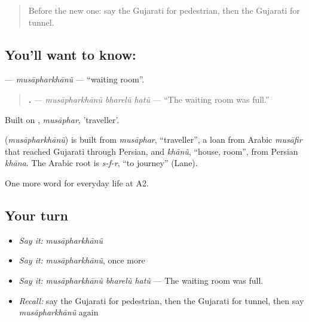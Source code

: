 \label{lesson:GU-C212-musapharkhanu}



\begin{quote}
Before the new one: say the Gujarati for pedestrian, then the Gujarati for tunnel.
\end{quote}

\subsection*{You'll want to know: }
\textbf{} — \emph{musāpharkhānũ} — \textquotedblleft{}waiting room\textquotedblright{}.

\begin{quote}
\textbf{  .} — \emph{musāpharkhānũ bharelũ hatũ} — \textquotedblleft{}The waiting room was full.\textquotedblright{}
\end{quote}

Built on \textbf{}, \emph{musāphar}, 'traveller'.

\begin{cousinweb}
\textbf{} (\emph{musāpharkhānũ}) is built from \emph{musāphar}, \textquotedblleft{}traveller\textquotedblright{}, a loan from Arabic \emph{musāfir} that reached Gujarati through Persian, and \emph{khānũ}, \textquotedblleft{}house, room\textquotedblright{}, from Persian \emph{khāna}. The Arabic root is \emph{s-f-r}, \textquotedblleft{}to journey\textquotedblright{} (Lane).
\end{cousinweb}

\begin{grammarlens}[title={What you've built}]
One more word for everyday life at A2.
\end{grammarlens}

\subsection*{Your turn}
\begin{itemize}
\raggedright
  \item \emph{Say it:} \emph{musāpharkhānũ}
  \item \emph{Say it:} \emph{musāpharkhānũ}, once more
  \item \emph{Say it:} \emph{musāpharkhānũ bharelũ hatũ} — The waiting room was full.
  \item \emph{Recall:} say the Gujarati for pedestrian, then the Gujarati for tunnel, then say \emph{musāpharkhānũ} again
\end{itemize}

